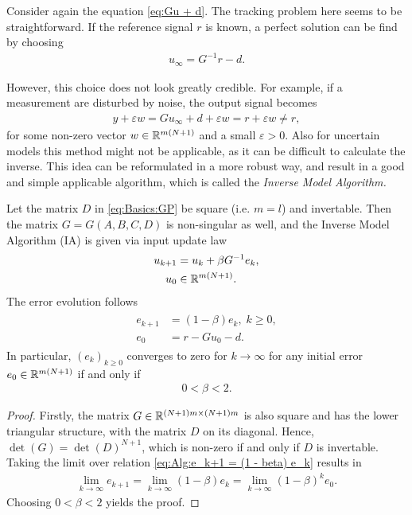 Consider again the equation \eqref{eq:Gu + d}. 
The tracking problem here seems to be straightforward.
If the reference signal $r$ is known, a perfect solution can be find by choosing 
\begin{align}
u_\infty = G^{-1} r -d.
\end{align}

However, this choice does not look greatly credible. 
For example, if a measurement are disturbed by noise, the output signal becomes
\begin{align}
y + \varepsilon w = G u_\infty + d + \varepsilon w = r + \varepsilon w \neq r,
\end{align}
for some non-zero vector $w \in {\mathbb{R}}^{m(N+1)}$ and a small $\varepsilon > 0$. 
Also for uncertain models this method might not be applicable, as it can be difficult to calculate the inverse. 
This idea can be reformulated in a more robust way, and result in a good and simple applicable algorithm, which is called the \textit{Inverse Model Algorithm.}


\begin{alg}
	\label{alg:ILC:IA}
	Let the matrix $D$ in \eqref{eq:Basics:GP} be square (i.e. $m = l$) and invertable. Then the matrix $G = G(A, B, C, D)$ is non-singular as well, and the Inverse Model Algorithm (IA) is given via input update law 
	\begin{align}
	\label{eq:errRightInv}
	\begin{split}
	u_{k+1} &= u_k + \beta G^{-1} e_k, \\
	u_0 & \in {\mathbb{R}}^{m (N+1)}.
	\end{split}	
	\end{align}
	The error evolution follows
	\begin{align}
	\label{eq:Alg:e_k+1 = (1 - beta) e_k}
	\begin{split}
	e_{k+1} &= (1- \beta) e_{k}, \; k\geq 0, \\
	e_0 &= r -  Gu_0 -d.
	\end{split}
	\end{align}
	In particular, $(e_k)_{k\geq 0}$ converges to zero for $k \to \infty$ for any initial error $e_0 \in {\mathbb{R}}^{m(N+1)}$ if and only if 
	\begin{align*}
	0 < \beta < 2.
	\end{align*}
\end{alg}
\begin{proof}
	Firstly, the matrix $G\in {\mathbb{R}}^{(N+1)m \times (N+1) m}$ is also square and has the lower triangular structure, with the matrix $D$ on its diagonal. Hence, $\det(G) = \det(D)^{N+1}$, which is non-zero if and only if $D$ is invertable.
	Taking the limit over relation \eqref{eq:Alg:e_k+1 = (1 - beta) e_k} results in
	\begin{align}
	\lim_{k \to \infty} e_{k+1} = \lim_{k \to \infty}(1- \beta) e_{k} = \lim_{k \to \infty}(1 - \beta)^k e_0.
	\end{align}
	Choosing $0<\beta < 2$ yields the proof. 
\end{proof}

